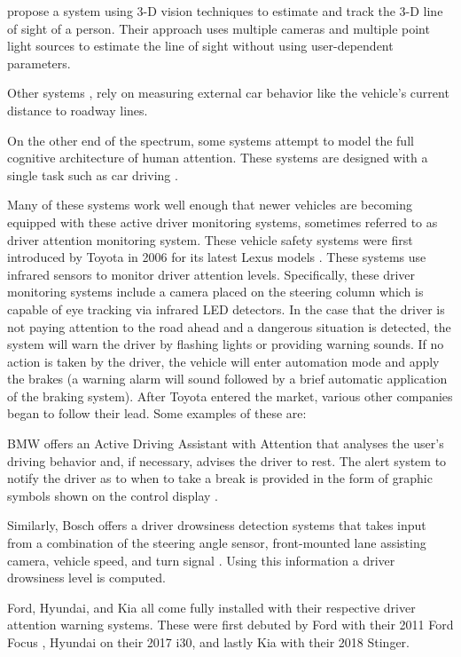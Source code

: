 \documentclass[10pt, conference, compsocconf]{IEEEtran}
\begin{document}
\cite{902895} propose a system using 3-D vision techniques to estimate and track the 3-D line of sight of a person. Their approach uses multiple cameras and multiple point light sources to estimate the line of sight without using user-dependent parameters.

Other systems \cite{252256}, \cite{tractor} rely on measuring external car behavior like the vehicle's current distance to roadway lines.

On the other end of the spectrum, some systems attempt to model the full cognitive architecture of human attention. These systems are designed with a single task such as car driving \cite{CognitiveModel}.

Many of these systems work well enough that newer vehicles are becoming equipped with these active driver monitoring systems, sometimes referred to as driver attention monitoring system. These vehicle safety systems were first introduced by Toyota in 2006 for its latest Lexus models \cite{toyota}. These systems use infrared sensors to monitor driver attention levels. Specifically, these driver monitoring systems include a camera placed on the steering column which is capable of eye tracking via infrared LED detectors. In the case that the driver is not paying attention to the road ahead and a dangerous situation is detected, the system will warn the driver by flashing lights or providing warning sounds. If no action is taken by the driver, the vehicle will enter automation mode and apply the brakes (a warning alarm will sound followed by a brief automatic application of the braking system). After Toyota entered the market, various other companies began to follow their lead. Some examples of these are:

BMW offers an Active Driving Assistant with Attention that analyses the user's driving behavior and, if necessary, advises the driver to rest. The alert system to notify the driver as to when to take a break is provided in the form of graphic symbols shown on the control display \cite{bmw}.

Similarly, Bosch offers a driver drowsiness detection systems that takes input from a combination of the steering angle sensor, front-mounted lane assisting camera, vehicle speed, and turn signal \cite{bosch}. Using this information a driver drowsiness level is computed.

Ford, Hyundai, and Kia all come fully installed with their respective driver attention warning systems. These were first debuted by Ford with their 2011 Ford Focus \cite{ford}, Hyundai on their 2017 i30, and lastly Kia with their 2018 Stinger.
\end{document}
